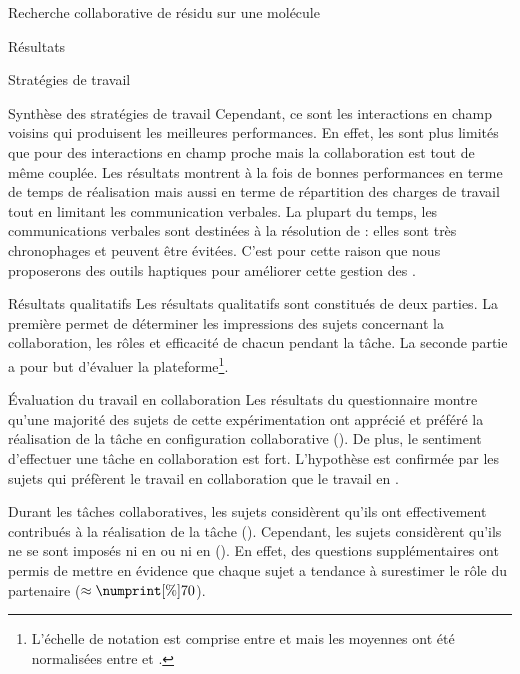 \documentclass[myfrancais,ngerman,english,french]{mythesis}
\begin{document}
\begin{mychapter}{Recherche collaborative de résidu sur une molécule}
\begin{mysection}{Résultats}
\begin{mysubsection}{Stratégies de travail}
\begin{mysubsubsection}{Synthèse des stratégies de travail}
					Cependant, ce sont les interactions en champ voisins qui produisent les meilleures performances.
					En effet, les  sont plus limités que pour des interactions en champ proche mais la collaboration est tout de même couplée.
					Les résultats montrent à la fois de bonnes performances en terme de temps de réalisation mais aussi en terme de répartition des charges de travail tout en limitant les communication verbales.
					La plupart du temps, les communications verbales sont destinées à la résolution de  : elles sont très chronophages et peuvent être évitées.
					C'est pour cette raison que nous proposerons des outils haptiques pour améliorer cette gestion des  .
				\end{mysubsubsection}
			\end{mysubsection}
			\begin{mysubsection}{Résultats qualitatifs}
				Les résultats qualitatifs sont constitués de deux parties.
				La première permet de déterminer les impressions des sujets concernant la collaboration, les rôles et efficacité de chacun pendant la tâche.
				La seconde partie a pour but d'évaluer la plateforme\footnote{L'échelle de notation est comprise entre  et  mais les moyennes ont été normalisées entre  et .}.
				\begin{mysubsubsection}{Évaluation du travail en collaboration}
					Les résultats du questionnaire montre qu'une majorité des sujets de cette expérimentation ont apprécié et préféré la réalisation de la tâche en configuration collaborative ().
					De plus, le sentiment d'effectuer une tâche en collaboration est fort.
					L'hypothèse  est confirmée par les sujets qui préfèrent le travail en collaboration que le travail en .

					Durant les tâches collaboratives, les sujets considèrent qu'ils ont effectivement contribués à la réalisation de la tâche ().
					Cependant, les sujets considèrent qu'ils ne se sont imposés ni en  ou ni en  ().
					En effet, des questions supplémentaires ont permis de mettre en évidence que chaque sujet a tendance à surestimer le rôle du partenaire ($\approx\mynum[\%]{70}$).


\end{mysubsubsection}
\end{mysubsection}
\end{mysection}
\end{mychapter}
\end{document}
